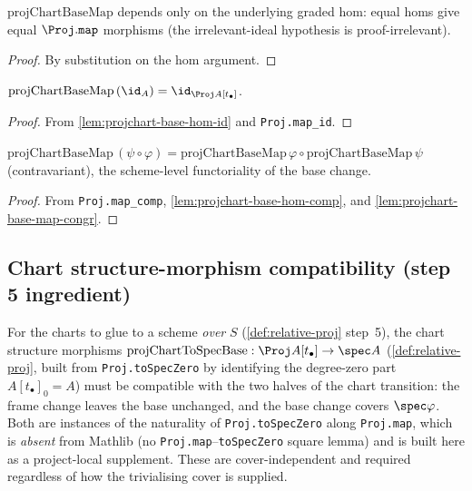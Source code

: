 \begin{lemma}

  \label{lem:projchart-base-map-congr}
  $\mathrm{projChartBaseMap}$ depends only on the underlying graded hom: equal
  homs give equal $\Proj.\mathtt{map}$ morphisms (the irrelevant-ideal hypothesis
  is proof-irrelevant).
\end{lemma}
\begin{proof} By substitution on the hom argument. \end{proof}

\begin{lemma}

  \label{lem:projchart-base-map-id}
  $\mathrm{projChartBaseMap}\,(\id_A)=\id_{\Proj A[t_\bullet]}$.
\end{lemma}
\begin{proof} From \cref{lem:projchart-base-hom-id} and \texttt{Proj.map\_id}. \end{proof}

\begin{lemma}

  \label{lem:projchart-base-map-comp}
  $\mathrm{projChartBaseMap}\,(\psi\circ\varphi)=
  \mathrm{projChartBaseMap}\,\varphi\circ\mathrm{projChartBaseMap}\,\psi$
  (contravariant), the scheme-level functoriality of the base change.
\end{lemma}
\begin{proof}
  From \texttt{Proj.map\_comp}, \cref{lem:projchart-base-hom-comp}, and
  \cref{lem:projchart-base-map-congr}.
\end{proof}

\subsection{Chart structure-morphism compatibility (step 5 ingredient)}
For the charts to glue to a scheme \emph{over} $S$ (\cref{def:relative-proj}
step~5), the chart structure morphisms
$\mathrm{projChartToSpecBase}:\Proj A[t_\bullet]\to\spec A$
(\cref{def:relative-proj}, built from \texttt{Proj.toSpecZero} by identifying the
degree-zero part $A[t_\bullet]_0=A$) must be compatible with the two halves of the
chart transition: the frame change leaves the base unchanged, and the base change
covers $\spec\varphi$. Both are instances of the naturality of
\texttt{Proj.toSpecZero} along \texttt{Proj.map}, which is \emph{absent} from
Mathlib (no \texttt{Proj.map}--\texttt{toSpecZero} square lemma) and is built here
as a project-local supplement. These are cover-independent and required regardless
of how the trivialising cover is supplied.

